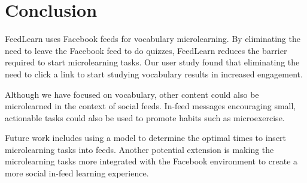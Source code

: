 \documentclass{sigchi}
\begin{document}
\section{Conclusion}

FeedLearn uses Facebook feeds for vocabulary microlearning.
By eliminating the need to leave the Facebook feed to do quizzes, FeedLearn reduces the barrier
required to start microlearning tasks. Our user study found that eliminating the need to click a link to start studying vocabulary results in increased engagement.

Although we have focused on vocabulary, other content could also be microlearned in the context of social feeds.  In-feed messages encouraging small, actionable tasks could also be used to promote habits such as microexercise.

Future work includes using a model to determine the optimal times to insert microlearning tasks into feeds. Another potential extension is making the microlearning tasks more integrated with the Facebook environment to create a more social in-feed learning experience. %





\end{document}
